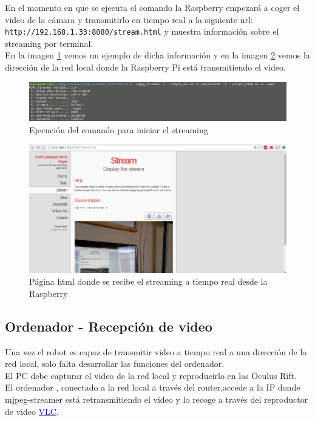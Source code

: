 \documentclass[twoside, 11pt]{epstfg}
\begin{document}
En el momento en que se ejecuta el comando la Raspberry empezará a coger el video de la cámara y transmitirlo en tiempo real a la siguiente url: \texttt{http://192.168.1.33:8080/stream.html} y muestra información sobre el streaming por terminal.\\
En la imagen \ref{fig::outmjpeg} vemos un ejemplo de dicha información y en la imagen \ref{fig::stream} vemos la dirección de la red local donde la Raspberry Pi está transmitiendo el video.

\begin{figure}[H]
	\centerline{
		\mbox{\includegraphics[width=.80\textwidth]{images/Streamingcomando.png}}
	}
	\caption{Ejecución del comando para iniciar el streaming}
	\label{fig::outmjpeg}
\end{figure}


\begin{figure}[H]
	\centerline{
		\mbox{\includegraphics[width=.80\textwidth]{images/pagStream.png}}
	}
	\caption{Página html donde se recibe el streaming a tiempo real desde la Raspberry }
	\label{fig::stream}
\end{figure}


\subsection{Ordenador - Recepción de video}
Una vez el robot es capaz de transmitir video a tiempo real a una dirección de la red local, solo falta desarrollar las funciones del ordenador.\\
El PC debe capturar el video de la red local y reproducirlo en las Oculus Rift.\\
El ordenador , conectado a la red local a través del router,accede a la IP donde mjpeg-streamer está retransmitiendo el video y lo recoge a través del reproductor de video  \href{http://www.videolan.org/vlc/}{\textcolor{blue}{VLC}}.
\end{document}
